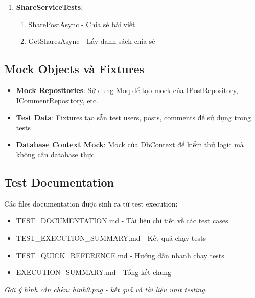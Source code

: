 \documentclass[a4paper]{article}
\begin{document}
\begin{enumerate}
        \begin{enumerate}
            \item SendFriendRequestAsync - Gửi yêu cầu kết bạn
            \item AcceptFriendRequestAsync - Chấp nhận yêu cầu
            \item DeclineFriendRequestAsync - Từ chối yêu cầu
        \end{enumerate}
        \item \textbf{ShareServiceTests}: 
        \begin{enumerate}
            \item SharePostAsync - Chia sẻ bài viết
            \item GetSharesAsync - Lấy danh sách chia sẻ
        \end{enumerate}
    \end{enumerate}

    \subsection{Mock Objects và Fixtures}
    \begin{itemize}
        \item \textbf{Mock Repositories}: Sử dụng Moq để tạo mock của IPostRepository, ICommentRepository, etc.
        \item \textbf{Test Data}: Fixtures tạo sẵn test users, posts, comments để sử dụng trong tests
        \item \textbf{Database Context Mock}: Mock của DbContext để kiểm thử logic mà không cần database thực
    \end{itemize}

    \subsection{Test Documentation}
    Các files documentation được sinh ra từ test execution:
    \begin{itemize}
        \item TEST\_DOCUMENTATION.md - Tài liệu chi tiết về các test cases
        \item TEST\_EXECUTION\_SUMMARY.md - Kết quả chạy tests
        \item TEST\_QUICK\_REFERENCE.md - Hướng dẫn nhanh chạy tests
        \item EXECUTION\_SUMMARY.md - Tổng kết chung
    \end{itemize}

    \textit{Gợi ý hình cần chèn: hinh9.png - kết quả và tài liệu unit testing.}
\end{document}
